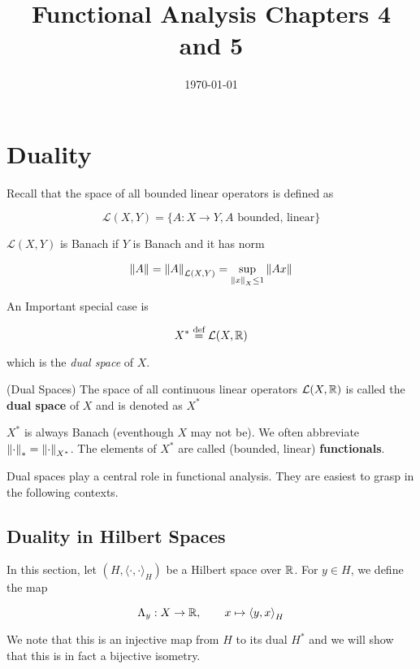 \documentclass{article}
\title{Functional Analysis Chapters 4 and 5}
\date{\today}
\begin{document}
\maketitle

\section{Duality}  

Recall that the space of all bounded linear operators is defined as

$$
\mathcal{L}(X,Y) = \{A: X \to Y, A \textrm{ bounded, linear}\}
$$ 

$\mathcal{L}(X,Y)$ is Banach if $Y$ is Banach and it has norm  

$$
\left\|{A}\right\| = \left\|{A}\right\|_{\mathcal{L}(X,Y)} = \sup_{\left\|{x}\right\|_X \leq 1} \left\|{Ax}\right\|
$$  

An Important special case is  

$$
X^* \overset{\textrm{def}}{=} \mathcal{L}(X,\mathbb{R})
$$  

which is the \textit{dual space} of $X$.  

\begin{definition}
    (Dual Spaces) The space of all continuous linear operators $\mathcal{L}(X, \mathbb{R})$ is called the \textbf{dual space} of $X$ and is denoted as  $X^*$
\end{definition}  

\begin{remark}
    $X^*$ is always Banach (eventhough $X$ may not be). We often abbreviate $\left\|{\cdot}\right\|_* = \left\|{\cdot}\right\|_{X^*}$. The elements of $X^*$ are called (bounded, linear) \textbf{functionals}.
\end{remark}

Dual spaces play a central role in functional analysis. They are easiest to grasp in the following contexts.  

\subsection{Duality in Hilbert Spaces}  
In this section, let $(H, {\langle \cdot, \cdot \rangle}_H )$ be a Hilbert space over $\mathbb{R}$. For $y\in H$, we define the map  

\begin{equation*}
    \Lambda_y: X \to \mathbb{R}, \qquad x \mapsto {\langle y, x \rangle}_H
\end{equation*}  

We note that this is an injective map from $H$ to its dual $H^*$ and we will show that this is in fact a bijective isometry.  
\end{document}
